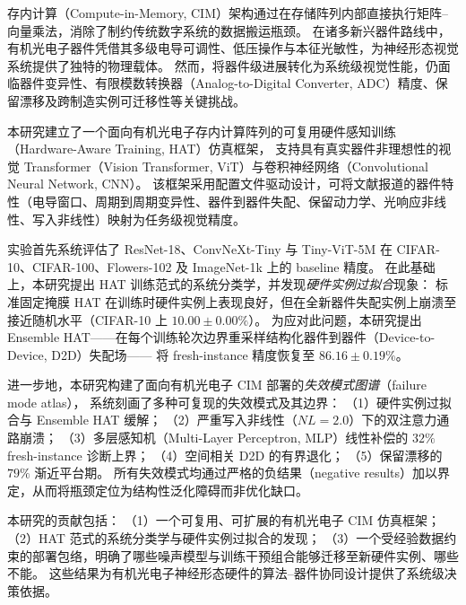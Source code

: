 \begin{chineseabstract}
存内计算（Compute-in-Memory, CIM）架构通过在存储阵列内部直接执行矩阵--向量乘法，消除了制约传统数字系统的数据搬运瓶颈。
在诸多新兴器件路线中，有机光电子器件凭借其多级电导可调性、低压操作与本征光敏性，为神经形态视觉系统提供了独特的物理载体。
然而，将器件级进展转化为系统级视觉性能，仍面临器件变异性、有限模数转换器（Analog-to-Digital Converter, ADC）精度、保留漂移及跨制造实例可迁移性等关键挑战。

本研究建立了一个面向有机光电子存内计算阵列的可复用硬件感知训练（Hardware-Aware Training, HAT）仿真框架，
支持具有真实器件非理想性的视觉 Transformer（Vision Transformer, ViT）与卷积神经网络（Convolutional Neural Network, CNN）。
该框架采用配置文件驱动设计，可将文献报道的器件特性（电导窗口、周期到周期变异性、器件到器件失配、保留动力学、光响应非线性、写入非线性）映射为任务级视觉精度。

实验首先系统评估了 ResNet-18、ConvNeXt-Tiny 与 Tiny-ViT-5M 在 CIFAR-10、CIFAR-100、Flowers-102 及 ImageNet-1k 上的 baseline 精度。
在此基础上，本研究提出 HAT 训练范式的系统分类学，并发现\emph{硬件实例过拟合}现象：
标准固定掩膜 HAT 在训练时硬件实例上表现良好，但在全新器件失配实例上崩溃至接近随机水平（CIFAR-10 上 $10.00\pm0.00\%$）。
为应对此问题，本研究提出 Ensemble HAT——在每个训练轮次边界重采样结构化器件到器件（Device-to-Device, D2D）失配场——
将 fresh-instance 精度恢复至 $86.16\pm0.19\%$。

进一步地，本研究构建了面向有机光电子 CIM 部署的\emph{失效模式图谱}（failure mode atlas），
系统刻画了多种可复现的失效模式及其边界：
（1）硬件实例过拟合与 Ensemble HAT 缓解；
（2）严重写入非线性（$NL=2.0$）下的双注意力通路崩溃；
（3）多层感知机（Multi-Layer Perceptron, MLP）线性补偿的 $32\%$ fresh-instance 诊断上界；
（4）空间相关 D2D 的有界退化；
（5）保留漂移的 $79\%$ 渐近平台期。
所有失效模式均通过严格的负结果（negative results）加以界定，从而将瓶颈定位为结构性泛化障碍而非优化缺口。

本研究的贡献包括：
（1）一个可复用、可扩展的有机光电子 CIM 仿真框架；
（2）HAT 范式的系统分类学与硬件实例过拟合的发现；
（3）一个受经验数据约束的部署包络，明确了哪些噪声模型与训练干预组合能够迁移至新硬件实例、哪些不能。
这些结果为有机光电子神经形态硬件的算法--器件协同设计提供了系统级决策依据。
\end{chineseabstract}
